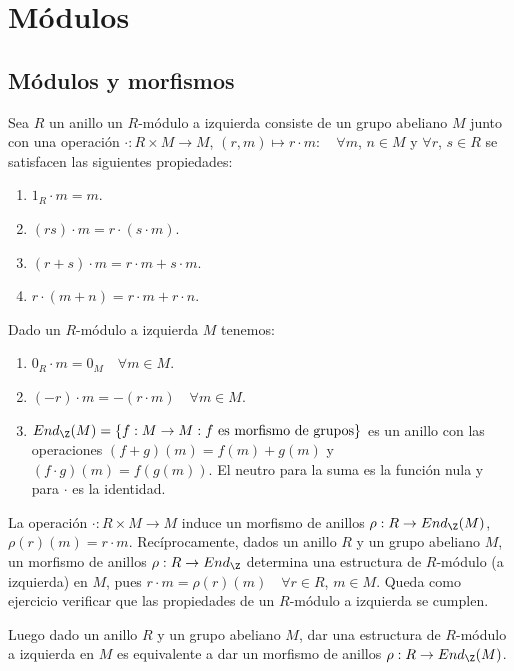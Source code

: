 \section{Módulos}
\subsection{Módulos y morfismos}

Sea \(R\) un anillo un \(R\)-módulo a izquierda consiste de un grupo abeliano \(M\) junto
con una operación \(\cdot : R \times M \to M\), \((r, m) \mapsto r \cdot m : \quad \forall m\), \(n \in M\)
y \(\forall r\), \(s \in R\) se satisfacen las siguientes propiedades:
\begin{enumerate}
    \item \(1_R \cdot m = m\).
    \item \((rs) \cdot m = r \cdot ( s \cdot m)\).
    \item \((r + s) \cdot m = r \cdot m + s \cdot m\).
    \item \(r \cdot (m + n) = r \cdot m + r \cdot n\).
\end{enumerate}

\begin{note}
    Dado un \(R\)-módulo a izquierda \(M\) tenemos: \begin{enumerate}
        \item \(0_R \cdot m = 0_M \quad \forall m \in M\).
        \item \((-r) \cdot m = - (r \cdot m) \quad \forall m \in M\).
        \item \(End_{\Z}(M) = \{ f : M \to M : f \text{ es morfismo de grupos} \}\) es un anillo con las operaciones \((f+g)(m) = f(m) + g(m)\) y \((f \cdot g)(m) = f(g(m))\). El neutro para la suma es la función nula y para \(\cdot\) es la identidad.
    \end{enumerate}
\end{note}

La operación \(\cdot : R \times M \to M\) induce un morfismo de anillos \(\rho : R \to End_{\Z}(M)\), \(\rho(r)(m) = r \cdot m\).
Recíprocamente, dados un anillo \(R\) y un grupo abeliano \(M\), un morfismo de anillos \(\rho : R \to End_{\Z}\) determina una estructura de \(R\)-módulo (a izquierda) en \(M\), pues
\(r \cdot m = \rho(r)(m) \quad \forall r \in R\), \(m \in M\). Queda como ejercicio verificar que las propiedades de un \(R\)-módulo a izquierda se cumplen.

Luego dado un anillo \(R\) y un grupo abeliano \(M\), dar una estructura de \(R\)-módulo a izquierda en \(M\) es equivalente a dar un morfismo de anillos \(\rho : R \to End_{\Z}(M)\).

